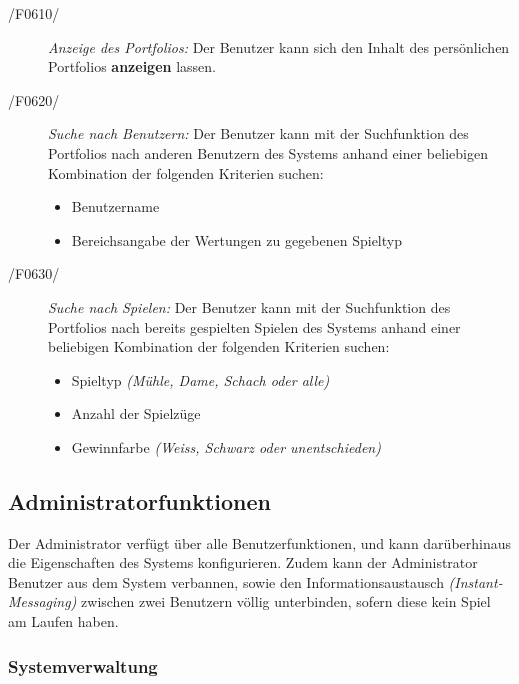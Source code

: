 \begin{description}
  \item[/F0610/]
    \textit{Anzeige des Portfolios:}
    Der Benutzer kann sich den Inhalt des persönlichen Portfolios \textbf{anzeigen} lassen.
  \item[/F0620/]
    \textit{Suche nach Benutzern:}
    Der Benutzer kann mit der Suchfunktion des Portfolios nach anderen Benutzern des Systems anhand einer beliebigen Kombination
    der folgenden Kriterien suchen:
    \begin{itemize}
      \item Benutzername
      \item Bereichsangabe der Wertungen zu gegebenen Spieltyp
    \end{itemize}
  \item[/F0630/]
    \textit{Suche nach Spielen:}
    Der Benutzer kann mit der Suchfunktion des Portfolios nach bereits gespielten Spielen des Systems anhand einer beliebigen Kombination
    der folgenden Kriterien suchen:
    \begin{itemize}
      \item Spieltyp \textit{(Mühle, Dame, Schach oder alle)}
      \item Anzahl der Spielzüge
      \item Gewinnfarbe \textit{(Weiss, Schwarz oder unentschieden)}
    \end{itemize}
\end{description}

\subsection{Administratorfunktionen}

Der Administrator verfügt über alle Benutzerfunktionen, und kann darüberhinaus die Eigenschaften des Systems konfigurieren.
Zudem kann der Administrator Benutzer aus dem System verbannen,
sowie den Informationsaustausch \textit{(Instant-Messaging)} zwischen zwei Benutzern völlig unterbinden,
sofern diese kein Spiel am Laufen haben.

\subsubsection{Systemverwaltung}


